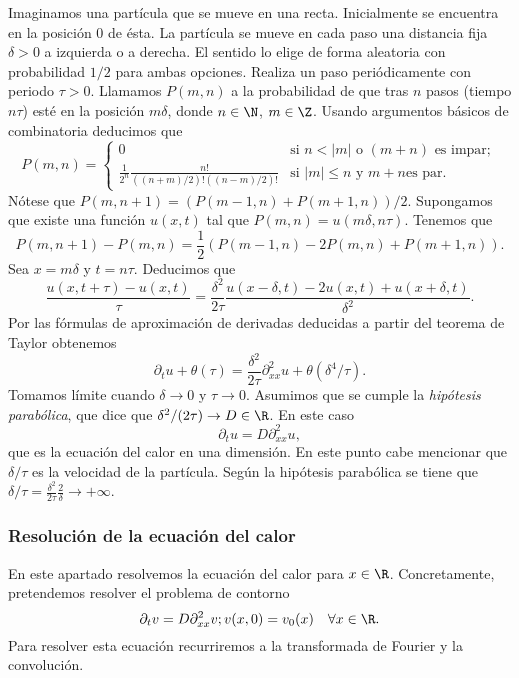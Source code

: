 \documentclass{article}
\begin{document}
Imaginamos una partícula que se mueve en una recta. Inicialmente se encuentra en la posición $0$ de
ésta. La partícula se mueve en cada paso una distancia fija $\delta > 0$ a izquierda o a derecha. El
sentido lo elige de forma aleatoria con probabilidad $1/2$ para ambas opciones. Realiza un paso
periódicamente con periodo $\tau > 0$. Llamamos $P(m,n)$ a la probabilidad de que tras $n$ pasos
(tiempo $n \tau$) esté en la posición $m \delta$, donde $n \in \N$, $m \in \Z$. Usando argumentos
básicos de combinatoria deducimos que
\[ P(m, n) =
  \begin{cases}
    0 & \text{si } n < |m| \text{ o } (m+n) \text{ es impar};\\
    \frac{1}{2^n} \frac{n!}{((n+m) / 2)! ((n-m) / 2)!} & \text{si } |m| \le n \text{ y } m+n \text{
      es par}.
  \end{cases}
\]
Nótese que $P(m,n+1) = (P(m-1, n) + P(m+1,n))/2$. Supongamos que existe una función $u(x,t)$ tal que
$P(m,n) = u(m\delta, n\tau)$. Tenemos que
\[ P(m,n+1) - P(m,n) = \frac{1}{2}(P(m-1,n) - 2P(m,n) + P(m+1,n)). \] Sea $x = m\delta$ y
$t = n\tau$. Deducimos que
\[ \frac{u(x,t+\tau) - u(x,t)}{\tau} = \frac{\delta^2}{2\tau}\frac{u(x-\delta,t) - 2u(x,t) +
    u(x+\delta,t)}{\delta^2}. \] Por las fórmulas de aproximación de derivadas deducidas a partir
del teorema de Taylor obtenemos
\[ \partial_t u + \theta(\tau) = \frac{\delta^2}{2\tau} \partial_{xx}^2u + \theta(\delta^4 /
  \tau). \] Tomamos límite cuando $\delta \to 0$ y $\tau \to 0$. Asumimos que se cumple la
\emph{hipótesis parabólica}, que dice que $\delta^2 / (2\tau) \to D \in \R$. En este caso
\[ \partial_t u = D \partial_{xx}^2u, \] que es la ecuación del calor en una dimensión.  En este
punto cabe mencionar que $\delta / \tau$ es la velocidad de la partícula. Según la hipótesis
parabólica se tiene que $\delta / \tau = \frac{\delta^2}{2\tau} \frac{2}{\delta} \to +\infty$.

\subsubsection{Resolución de la ecuación del calor}

En este apartado resolvemos la ecuación del calor para $x \in \R$. Concretamente, pretendemos
resolver el problema de contorno
\begin{equation}
  \label{eq:calor:1}
  \partial_t v = D \partial_{xx}^2 v; \\
  v(x,0) = v_0(x) \quad \forall x \in \R.
\end{equation}
Para resolver esta ecuación recurriremos a la transformada de Fourier y la convolución.
\end{document}
